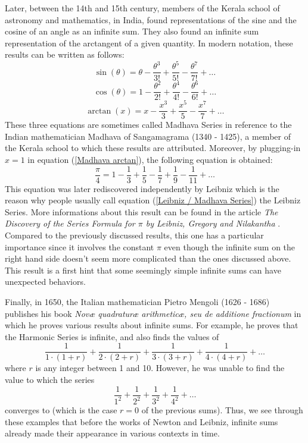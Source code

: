 Later, between the 14th and 15th century, members of the Kerala school of astronomy and mathematics, in India, found representations of the sine and the cosine of an angle as an infinite sum. They also found an infinite sum representation of the arctangent of a given quantity. In modern notation, these results can be written as follows:
\begin{equation}
    \sin(\theta) = \theta - \frac{\theta^3}{3!} + \frac{\theta^5}{5!} - \frac{\theta^7}{7!} + \dots
\end{equation}
\begin{equation}
    \cos(\theta) = 1 - \frac{\theta^2}{2!} + \frac{\theta^4}{4!} - \frac{\theta^6}{6!} + \dots
\end{equation}
\begin{equation} \label{Madhava arctan}
    \arctan(x) = x - \frac{x^3}{3} + \frac{x^5}{5} - \frac{x^7}{7} + \dots
\end{equation}
These three equations are sometimes called Madhava Series in reference to the Indian mathematician Madhava of Sangamagrama (1340 - 1425), a member of the Kerala school to which these results are attributed. Moreover, by plugging-in $x=1$ in equation (\ref{Madhava arctan}), the following equation is obtained:
\begin{equation} \label{Leibniz / Madhava Series}
    \frac{\pi}{4} = 1 - \frac{1}{3} + \frac{1}{5} - \frac{1}{7} + \frac{1}{9} - \frac{1}{11} + \dots
\end{equation}
This equation was later rediscovered independently by Leibniz which is the reason why people usually call equation (\ref{Leibniz / Madhava Series}) the Leibniz Series. More informations about this result can be found in the article \textit{The Discovery of the Series Formula for $\pi$ by Leibniz, Gregory and Nilakantha} \cite{LeibnizMadhavaSeries}. Compared to the previously discussed results, this one has a particular importance since it involves the constant $\pi$ even though the infinite sum on the right hand side doesn't seem more complicated than the ones discussed above. This result is a first hint that some seemingly simple infinite sums can have unexpected behaviors.

Finally, in 1650, the Italian mathematician Pietro Mengoli (1626 - 1686) publishes his book \textit{Novæ quadraturæ arithmeticæ, seu de additione fractionum} \cite{mengoli1650nouæ} in which he proves various results about infinite sums. For example, he proves that the Harmonic Series is infinite, and also finds the values of
$$\frac{1}{1\cdot(1 + r)} + \frac{1}{2\cdot(2 + r)} + \frac{1}{3\cdot(3 + r)} + \frac{1}{4\cdot(4 + r)} + \dots$$
where $r$ is any integer between 1 and 10. However, he was unable to find the value to which the series
$$\frac{1}{1^2} + \frac{1}{2^2} + \frac{1}{3^2} + \frac{1}{4^2} + \dots$$
converges to (which is the case $r=0$ of the previous sums). Thus, we see through these examples that before the works of Newton and Leibniz, infinite sums already made their appearance in various contexts in time.

